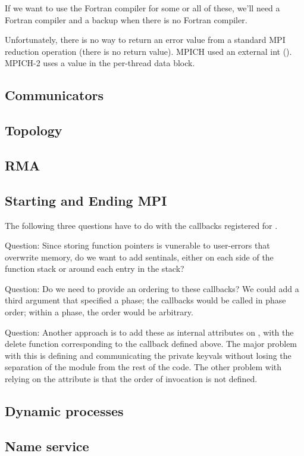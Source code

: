 \documentclass{article}
\begin{document}
If we want to use the Fortran compiler for some or all of these, we'll
need a Fortran compiler and a backup when there is no Fortran compiler.

Unfortunately, there is no way to return an error value from a standard MPI
reduction operation (there is no return value).  MPICH used an external int
().  MPICH-2 uses a value in the per-thread data block. 

\subsection{Communicators}
\subsection{Topology}
\subsection{RMA}  
\subsection{Starting and Ending MPI}

The following three questions have to do with the callbacks registered
for .

Question:
Since storing function pointers is vunerable to user-errors that
overwrite memory, do we want to add sentinals, either on each side of
the function stack or around each entry in the stack?

Question: 
Do we need to provide an ordering to these callbacks?  We could add a
third argument that specified a phase; the callbacks would be called
in phase order; within a phase, the order would be arbitrary.

Question:
Another approach is to add these as internal attributes on
, with the delete function corresponding to
the callback defined above. The major problem with this is defining
and communicating the private keyvals without losing the separation
of the module from the rest of the code.  The other problem with
relying on the attribute is that the order of invocation is not defined.

\subsection{Dynamic processes}
\subsection{Name service}
\end{document}
